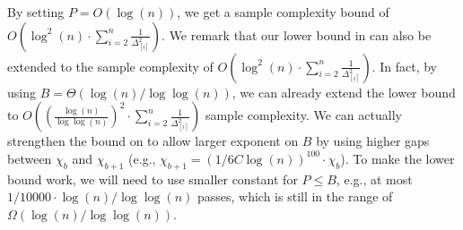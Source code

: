 
\begin{remark}
	\label{rmk:sample-lb-higher-polylog}
	By setting $P=O(\log(n))$, we get a sample complexity bound of $O(\log^2 (n)\cdot \sum_{i=2}^{n}\frac{1}{\Delta^{2}_{[i]}})$. We remark that our lower bound in  can also be extended to the sample complexity of $O(\log^2 (n)\cdot \sum_{i=2}^{n}\frac{1}{\Delta^{2}_{[i]}})$. In fact, by using $B=\Theta(\log(n)/\log\log(n))$, we can already extend the lower bound to $O((\frac{\log(n)}{\log\log(n)})^2\cdot \sum_{i=2}^{n}\frac{1}{\Delta^{2}_{[i]}})$ sample complexity. We can actually strengthen the bound on  to allow larger exponent on $B$ by using higher gaps between $\chi_{b}$ and $\chi_{b+1}$ (e.g., $\chi_{b+1}= ({1}/{6 C \log(n)})^{100} \cdot \chi_{b}$). To make the lower bound work, we will need to use smaller constant for $P\leq B$, e.g., at most ${1}/{10000}\cdot \log(n)/\log\log(n)$ passes, which is still in the range of $\Omega(\log(n)/\log\log(n))$.
\end{remark}